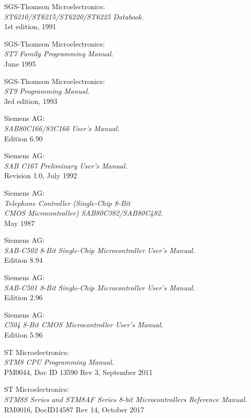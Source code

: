 SGS-Thomson Microelectronics: \\
		{\em ST6210/ST6215/ST6220/ST6225 Databook.\/} \\
		1st edition, 1991

 SGS-Thomson Microelectronics: \\
		{\em ST7 Family Programming Manual.\/} \\
		June 1995

 SGS-Thomson Microelectronics: \\
		{\em ST9 Programming Manual.\/} \\
		3rd edition, 1993

 Siemens AG: \\
		{\em SAB80C166/83C166 User's Manual.\/} \\
		Edition 6.90

 Siemens AG: \\
		{\em SAB C167 Preliminary User's Manual.\/} \\
		Revision 1.0, July 1992

 Siemens AG: \\
		{\em Telephone Controller (Single-Chip 8-Bit \\
		CMOS Microcontroller) SAB80C382/SAB80C482.\/}\\
		May 1987

 Siemens AG: \\
		{\em SAB-C502 8-Bit Single-Chip Microcontroller User's
		Manual.\/} \\
		Edition 8.94

 Siemens AG: \\
		{\em SAB-C501 8-Bit Single-Chip Microcontroller User's
		Manual.\/} \\
		Edition 2.96

 Siemens AG: \\
		{\em C504 8-Bit CMOS Microcontroller User's Manual.\/} \\
		Edition 5.96

 ST Microelectronics: \\
		{\em STM8 CPU Programming Manual.\/} \\
		PM0044, Doc ID 13590 Rev 3, September 2011

 ST Microelectronics: \\
		{\em STM8S Series and STM8AF Series 8-bit Microcontrollers Reference Manual.\/} \\
		RM0016, DocID14587 Rev 14, October 2017

